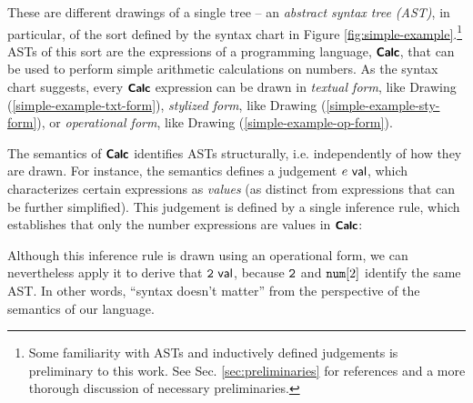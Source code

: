 \noindent
These are different drawings of a single tree -- an \emph{abstract syntax tree (AST)}, in particular, of the sort defined by the syntax chart in Figure \ref{fig:simple-example}.\footnote{Some familiarity with ASTs and inductively defined judgements is preliminary to this work. See Sec. \ref{sec:preliminaries} for references and a more thorough discussion of necessary preliminaries.} ASTs of this sort are the expressions of a programming language, $\simplelang$, that can be used to perform simple arithmetic calculations on numbers. 
As the syntax chart suggests, every $\simplelang$ expression can be drawn in \emph{textual form}, like Drawing (\ref{simple-example-txt-form}), \emph{stylized form}, like Drawing (\ref{simple-example-sty-form}), or \emph{operational form}, like Drawing (\ref{simple-example-op-form}).





 The semantics of $\simplelang$ identifies ASTs {structurally}, i.e. independently of how they are drawn. For instance, the semantics defines a judgement $\isvalU{e}$, which characterizes certain expressions as \emph{values} (as distinct from  expressions that can be further simplified). This judgement is defined by a single inference rule, which establishes that only the number expressions are values in $\simplelang$:
\begin{mathpar}
\end{mathpar}
Although this inference rule is drawn using an operational form, we can nevertheless apply it to derive that $\isvalU{\numintro{2}}$, because $\numintro{2}$ and $\anumintro{2}$ identify the same AST. In other words, ``syntax doesn't matter'' from the perspective of the semantics of our language.


